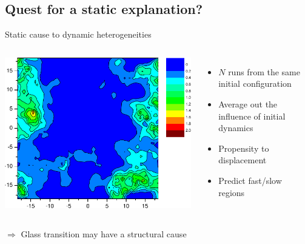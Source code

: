 \subsection{Quest for a static explanation?}
\begin{frame}{Static cause to dynamic heterogeneities}
	\begin{columns}
	\centering
	\includegraphics[width=\columnwidth]{propensity}
	\footnotesize{\citet{Widmer-Cooper2005}}
	\begin{itemize}
		\item $N$ runs from the same initial configuration
		\item Average out the influence of initial dynamics
		\item Propensity to displacement
		\item Predict fast/slow \alert{regions} \footnotesize{\citep{Berthier2007}}
	\end{itemize}
	\end{columns}
	
	\bigskip$\Rightarrow$ Glass transition may have a structural cause
\end{frame}

